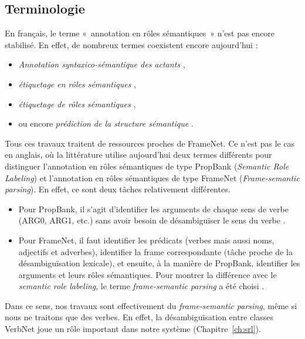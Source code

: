 \subsection{Terminologie}

En français, le terme «~annotation en rôles sémantiques~» n'est pas encore
stabilisé. En effet, de nombreux termes coexistent encore aujourd'hui :

\begin{itemize}
    \item \textit{Annotation syntaxico-sémantique des actants}
        \citep{hadouche2011annotation},
    \item \textit{étiquetage en rôles sémantiques} \citep{boros2014etiquetage},
    \item \textit{étiquetage de rôles sémantiques}
        \citep{lechelle2014utilisation},
    \item ou encore \textit{prédiction de la structure sémantique}
        \citep{michalon2014modelisation}.
\end{itemize}

Tous ces travaux traitent de ressources proches de FrameNet. Ce n'est pas le
cas en anglais, où la littérature utilise aujourd'hui deux termes différents
pour distinguer l'annotation en rôles sémantiques de type PropBank
(\textit{Semantic Role Labeling}) et l'annotation en rôles sémantiques de type
FrameNet (\textit{Frame-semantic parsing}). En effet, ce sont deux tâches
relativement différentes.

\begin{itemize}
    \item Pour PropBank, il s'agit d'identifier les arguments de chaque sens de
        verbe (ARG0, ARG1, etc.) sans avoir besoin de désambiguïser le sens du
        verbe \citep{carreras2005introduction}.
    \item Pour FrameNet, il faut identifier les prédicats (verbes mais aussi
        noms, adjectifs et adverbes), identifier la frame correspondante (tâche
        proche de la désambiguïsation lexicale), et ensuite, à la manière de
        PropBank, identifier les arguments et leurs rôles sémantiques. Pour
        montrer la différence avec le \textit{semantic role labeling}, le terme
        \textit{frame-semantic parsing} a été choisi
        \citep{das2010probabilistic}.
\end{itemize}

Dans ce sens, nos travaux sont effectivement du \textit{frame-semantic
parsing}, même si nous ne traitons que des verbes. En effet, la
désambiguïsation entre classes VerbNet joue un rôle important dans notre
système (Chapitre~\ref{ch:srl}).


